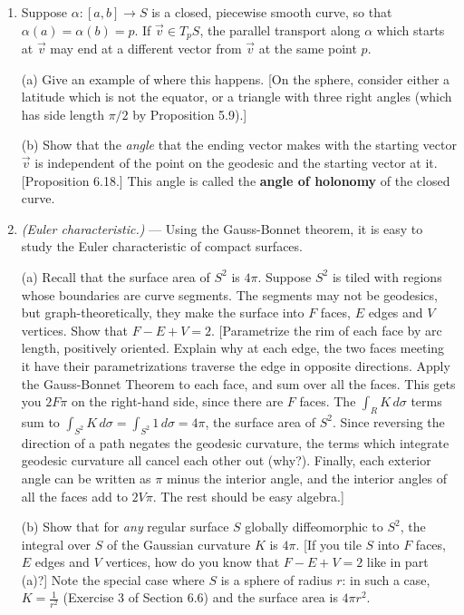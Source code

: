 \documentclass[leqno]{book}
\begin{document}
\begin{enumerate}
\item Suppose $\alpha:[a,b]\to S$ is a closed, piecewise smooth curve, so that $\alpha(a)=\alpha(b)=p$.  If $\vec v\in T_pS$, the parallel transport along $\alpha$ which starts at $\vec v$ may end at a different vector from $\vec v$ at the same point $p$.

(a) Give an example of where this happens.  [On the sphere, consider either a latitude which is not the equator, or a triangle with three right angles (which has side length $\pi/2$ by Proposition 5.9).]

(b) Show that the \emph{angle} that the ending vector makes with the starting vector $\vec v$ is independent of the point on the geodesic and the starting vector at it.  [Proposition 6.18.]  This angle is called the \textbf{angle of holonomy} of the closed curve.

\item\emph{(Euler characteristic.)} \---- Using the Gauss-Bonnet theorem, it is easy to study the Euler characteristic of compact surfaces.

(a) Recall that the surface area of $S^2$ is $4\pi$.  Suppose $S^2$ is tiled with regions whose boundaries are curve segments.  The segments may not be geodesics, but graph-theoretically, they make the surface into $F$ faces, $E$ edges and $V$ vertices.  Show that $F-E+V=2$.  [Parametrize the rim of each face by arc length, positively oriented.  Explain why at each edge, the two faces meeting it have their parametrizations traverse the edge in opposite directions.  Apply the Gauss-Bonnet Theorem to each face, and sum over all the faces.  This gets you $2F\pi$ on the right-hand side, since there are $F$ faces.  The $\int_RK\,d\sigma$ terms sum to $\int_{S^2}K\,d\sigma=\int_{S^2}1\,d\sigma=4\pi$, the surface area of $S^2$.  Since reversing the direction of a path negates the geodesic curvature, the terms which integrate geodesic curvature all cancel each other out (why?).  Finally, each exterior angle can be written as $\pi$ minus the interior angle, and the interior angles of all the faces add to $2V\pi$.  The rest should be easy algebra.]

(b) Show that for \emph{any} regular surface $S$ globally diffeomorphic to $S^2$, the integral over $S$ of the Gaussian curvature $K$ is $4\pi$.  [If you tile $S$ into $F$ faces, $E$ edges and $V$ vertices, how do you know that $F-E+V=2$ like in part (a)?]  Note the special case where $S$ is a sphere of radius $r$: in such a case, $K=\frac 1{r^2}$ (Exercise 3 of Section 6.6) and the surface area is $4\pi r^2$.


\end{enumerate}
\end{document}
